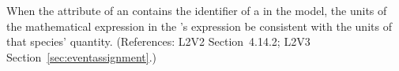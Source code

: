 When the  attribute of an \EventAssignment
contains the identifier of a \Species in the model, the
units of the mathematical expression in the
\EventAssignment's  expression  be
consistent with the units of that species' quantity.
(References: L2V2 Section~4.14.2; L2V3 Section~\ref{sec:eventassignment}.)

